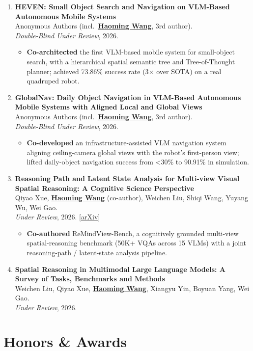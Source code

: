 \documentclass[11pt, letterpaper]{article}
\newenvironment{publistcont}{
  \begin{enumerate}[resume*=pubs]
}{\end{enumerate}}
\newcommand{\impactbullet}[1]{%
  \par\vspace{1pt}%
  \begin{itemize}[leftmargin=1.2em, topsep=0pt, itemsep=0pt, parsep=0pt, partopsep=0pt]
    \item #1
  \end{itemize}}
\newcommand{\me}{\underline{\textbf{Haoming Wang}}}
\newcommand{\meco}{\underline{\textbf{Haoming Wang}} (co-author)}
\newcommand{\meanon}{\underline{\textbf{Haoming Wang}}}
\begin{document}
\begin{publistcont}
\item\label{pub:heven} \textbf{HEVEN: Small Object Search and Navigation on VLM-Based Autonomous Mobile Systems}\\
Anonymous Authors (incl.\ \meanon, 3rd author).\\
\textit{Double-Blind Under Review}, 2026.
\impactbullet{\textbf{Co-architected} the first VLM-based mobile system for small-object search, with a hierarchical spatial semantic tree and Tree-of-Thought planner; achieved 73.86\% success rate (3$\times$ over SOTA) on a real quadruped robot.}

\item\label{pub:globalnav} \textbf{GlobalNav: Daily Object Navigation in VLM-Based Autonomous Mobile Systems with Aligned Local and Global Views}\\
Anonymous Authors (incl.\ \meanon, 3rd author).\\
\textit{Double-Blind Under Review}, 2026.
\impactbullet{\textbf{Co-developed} an infrastructure-assisted VLM navigation system aligning ceiling-camera global views with the robot's first-person view; lifted daily-object navigation success from <30\% to 90.91\% in simulation.}

\item\label{pub:remindview} \textbf{Reasoning Path and Latent State Analysis for Multi-view Visual Spatial Reasoning: A Cognitive Science Perspective}\\
Qiyao Xue, \meco, Weichen Liu, Shiqi Wang, Yuyang Wu, Wei Gao.\\
\textit{Under Review}, 2026. \href{https://arxiv.org/abs/2512.02340}{[arXiv]}
\impactbullet{\textbf{Co-authored} ReMindView-Bench, a cognitively grounded multi-view spatial-reasoning benchmark (50K+ VQAs across 15 VLMs) with a joint reasoning-path / latent-state analysis pipeline.}

\item\label{pub:survey} \textbf{Spatial Reasoning in Multimodal Large Language Models: A Survey of Tasks, Benchmarks and Methods}\\
Weichen Liu, Qiyao Xue, \me, Xiangyu Yin, Boyuan Yang, Wei Gao.\\
\textit{Under Review}, 2026.
\end{publistcont}

\section{Honors \& Awards}
\end{document}
